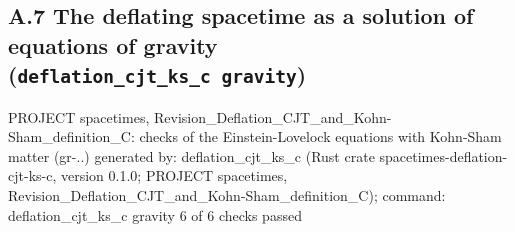 \documentclass[
  10pt,
]{article}
\newenvironment{Shaded}{}{}
\newcommand{\NormalTok}[1]{#1}
\begin{document}
\hypertarget{a.7-the-deflating-spacetime-as-a-solution-of-equations-of-gravity-deflation_cjt_ks_c-gravity}{%
\subsection{\texorpdfstring{A.7 The deflating spacetime as a solution of
equations of gravity
(\texttt{deflation\_cjt\_ks\_c\ gravity})}{A.7 The deflating spacetime as a solution of equations of gravity (deflation\_cjt\_ks\_c gravity)}}\label{a.7-the-deflating-spacetime-as-a-solution-of-equations-of-gravity-deflation_cjt_ks_c-gravity}}

\begin{Shaded}
\begin{Highlighting}[]
\NormalTok{PROJECT spacetimes, Revision\_Deflation\_CJT\_and\_Kohn{-}Sham\_definition\_C: checks of the Einstein{-}Lovelock equations with Kohn{-}Sham matter (gr{-}..)}
\NormalTok{generated by: deflation\_cjt\_ks\_c (Rust crate spacetimes{-}deflation{-}cjt{-}ks{-}c, version 0.1.0; PROJECT spacetimes, Revision\_Deflation\_CJT\_and\_Kohn{-}Sham\_definition\_C); command: deflation\_cjt\_ks\_c gravity}
\NormalTok{6 of 6 checks passed}


\end{Highlighting}
\end{Shaded}
\end{document}
